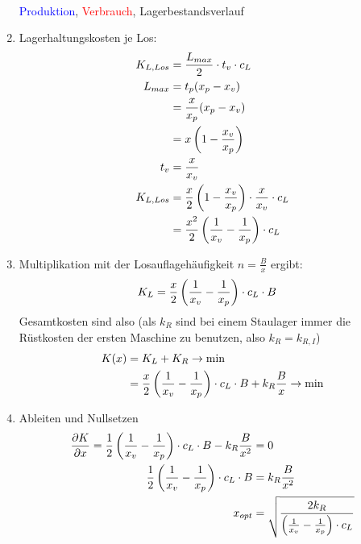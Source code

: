 \documentclass{article}
\begin{document}
\begin{enumerate}[label=(\alph*)]
\begin{center}
 \\
			\textcolor{blue}{Produktion}, \textcolor{red}{Verbrauch}, \textcolor{green!80!black}{Lagerbestandsverlauf}
		\end{center}
	\item Lagerhaltungskosten je Los:
	\begin{align}
		K_{L,Los} &= \frac{L_{max}}{2} \cdot t_v \cdot c_L \notag \\
		L_{max} &= t_p(x_p-x_v) \notag \\
		&= \frac{x}{x_p}(x_p-x_v) \notag \\
		&= x\left(1-\frac{x_v}{x_p}\right) \notag \\
		t_v &= \frac{x}{x_v} \notag \\
		K_{L,Los} &= \frac{x}{2}\left(1-\frac{x_v}{x_p}\right) \cdot \frac{x}{x_v}\cdot c_L \notag \\
		&= \frac{x^2}{2}\left(\frac{1}{x_v}-\frac{1}{x_p}\right)\cdot c_L \notag
	\end{align}
	\item Multiplikation mit der Losauflagehäufigkeit $n=\frac{B}{x}$ ergibt:
	\begin{align}
		K_L &= \frac{x}{2}\left(\frac{1}{x_v}-\frac{1}{x_p}\right)\cdot c_L\cdot B \notag
	\end{align}
	Gesamtkosten sind also (als $k_R$ sind bei einem Staulager immer die Rüstkosten der ersten Maschine zu benutzen, also $k_R=k_{R,I}$)
	\begin{align}
		K(x) &= K_L + K_R \to\min \notag \\
		&= \frac{x}{2}\left(\frac{1}{x_v}-\frac{1}{x_p}\right)\cdot c_L\cdot B + k_R\frac{B}{x} \to\min \notag
	\end{align}
	\item Ableiten und Nullsetzen
	\begin{align}
		\frac{\partial K}{\partial x} = \frac{1}{2}\left(\frac{1}{x_v}-\frac{1}{x_p}\right)\cdot c_L\cdot B - k_R\frac{B}{x^2} &= 0 \notag \\
		\frac{1}{2}\left(\frac{1}{x_v}-\frac{1}{x_p}\right)\cdot c_L\cdot B &= k_R\frac{B}{x^2} \notag \\
		x_{opt} &= \sqrt{\frac{2k_R}{\left(\frac{1}{x_v}-\frac{1}{x_p}\right)\cdot c_L}} \notag
	\end{align}
	\end{enumerate}
	
\end{document}
